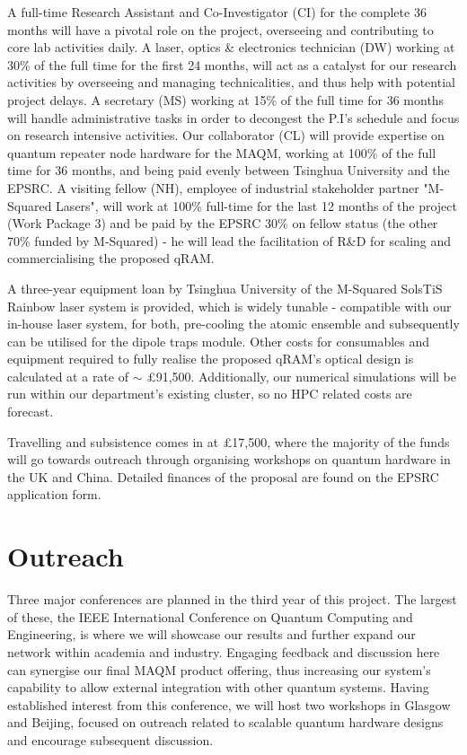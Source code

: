 \documentclass{epsrc}
\begin{document}
A full-time Research Assistant and Co-Investigator (CI) for the complete 36 months will have a pivotal role on the project, overseeing and contributing to core lab activities daily. A laser, optics \& electronics technician (DW) working at 30\% of the full time for the first 24 months, will act as a catalyst for our research activities by overseeing and managing technicalities, and thus help with potential project delays. A secretary (MS) working at 15\% of the full time for 36 months will handle administrative tasks in order to decongest the P.I's schedule and focus on research intensive activities. Our collaborator (CL) will provide expertise on quantum repeater node hardware for the MAQM, working at 100\% of the full time for 36 months, and being paid evenly between Tsinghua University and the EPSRC. A visiting fellow (NH), employee of industrial stakeholder partner "M-Squared Lasers", will work at 100\% full-time for the last 12 months of the project (Work Package 3) and be paid by the EPSRC 30\% on fellow status (the other 70\% funded by M-Squared) - he will lead the facilitation of R\&D for scaling and commercialising the proposed qRAM.

A three-year equipment loan by Tsinghua University of the M-Squared SolsTiS Rainbow laser system is provided, which is widely tunable - compatible with our in-house laser system, for both, pre-cooling the atomic ensemble and subsequently can be utilised for the dipole traps module. Other costs for consumables and equipment required to fully realise the proposed qRAM's optical design is calculated at a rate of $\sim$ £91,500. Additionally, our numerical simulations will be run within our department's existing cluster, so no HPC related costs are forecast.

Travelling and subsistence comes in at £17,500, where the majority of the funds will go towards outreach through organising workshops on quantum hardware in the UK and China. Detailed finances of the proposal are found on the EPSRC application form.

\vspace{15pt}

\section{Outreach}
Three major conferences are planned in the third year of this project. The largest of these, the IEEE International Conference on Quantum Computing and Engineering, is where we will showcase our results and further expand our network within academia and industry. Engaging feedback and discussion here can synergise our final MAQM product offering, thus increasing our system's capability to allow external integration with other quantum systems. Having established interest from this conference, we will host two workshops in Glasgow and Beijing, focused on outreach related to scalable quantum hardware designs and encourage subsequent discussion. 

\vspace{15pt}
 
\end{document}
